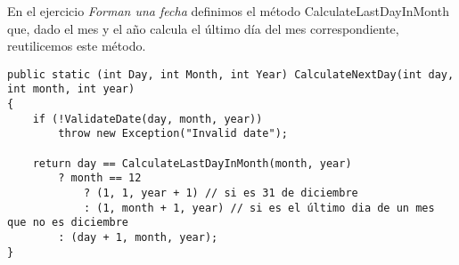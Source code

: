 En el ejercicio \textit{Forman una fecha} definimos el método CalculateLastDayInMonth que, dado el mes y el año calcula el último día del mes correspondiente, reutilicemos este método.

\begin{lstlisting}
public static (int Day, int Month, int Year) CalculateNextDay(int day, int month, int year)
{
    if (!ValidateDate(day, month, year))
        throw new Exception("Invalid date");
        
    return day == CalculateLastDayInMonth(month, year)
        ? month == 12
            ? (1, 1, year + 1) // si es 31 de diciembre
            : (1, month + 1, year) // si es el último dia de un mes que no es diciembre
        : (day + 1, month, year);
}
\end{lstlisting}